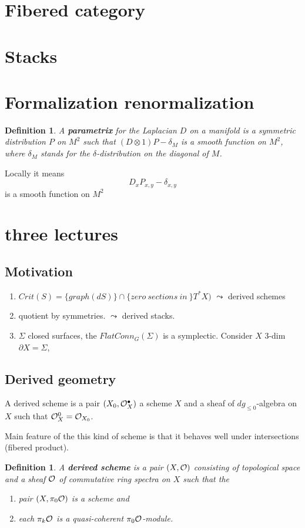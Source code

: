 \documentclass[11pt]{article}
\newtheorem{dfn}[thm]{Definition}
\newcommand{\pd}{{\partial}}
\newcommand{\calo}{{\cal O}}
\begin{document}
\section{Fibered category}
\section{Stacks}
\section{Formalization renormalization}
\begin{dfn}
A \textbf{parametrix} for the Laplacian $D$ on a manifold is a symmetric distribution $P$ on $M^2$ such that $(D\otimes 1)P-\delta_M$ is a smooth function on $M^2$, where $\delta_M$ stands for the $\delta$-distribution on the diagonal of $M$.
\end{dfn}
Locally it means
$$
D_x P_{x,y}-\delta_{x,y}
$$
is a smooth function on $M^2$

\section{three lectures}
\subsection{Motivation}
\begin{enumerate}
\item $Crit(S)=\{graph(dS)\}\cap \{zero\ sections\ in\ \} T^*X) $ $\leadsto$ derived schemes
\item quotient by symmetries. $\leadsto$ derived stacks.
\item $\Sigma$ closed surfaces, the $FlatConn_G(\Sigma)$ is a symplectic.
Consider $X$ 3-dim $\pd X=\Sigma$,
\end{enumerate}
\subsection{
Derived geometry}
A derived scheme is a pair $(X_0,\calo_X^\bullet)$ a scheme $X$ and a sheaf of $dg_{\leq 0}$-algebra on $X$ such that $\calo^0_{X}=\calo_{X_0}$.

Main feature of the this kind of scheme is that it behaves well under intersections (fibered product).

\begin{dfn}
A \textbf{derived scheme} is a pair $(X,\calo)$ consisting of topological space and a sheaf $\calo$ of commutative ring spectra on $X$ such that the
\begin{enumerate}
\item pair $(X,\pi_0\calo)$ is a scheme and 
\item each $\pi_k\calo$ is a quasi-coherent $\pi_0\calo$-module.
\end{enumerate}
\end{dfn}
\end{document}
